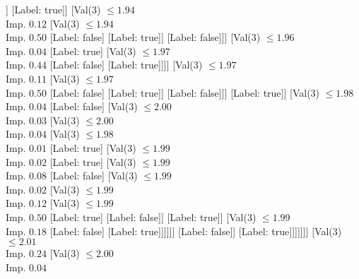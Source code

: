 \documentclass[margin=10pt]{standalone}
\begin{document}
\begin{forest}
													[Val($3$) $ \leq 1.94$ \\ Imp. $0.17$
														[Val($3$) $ \leq 1.93$ \\ Imp. $0.05$
															[Val($3$) $ \leq 1.93$ \\ Imp. $0.44$
																[Label: true]
																[Label: false]]
															[Label: true]]
														[Val($3$) $ \leq 1.94$ \\ Imp. $0.12$
															[Val($3$) $ \leq 1.94$ \\ Imp. $0.50$
																[Label: false]
																[Label: true]]
															[Label: false]]]
													[Val($3$) $ \leq 1.96$ \\ Imp. $0.04$
														[Label: true]
														[Val($3$) $ \leq 1.97$ \\ Imp. $0.44$
															[Label: false]
															[Label: true]]]]
												[Val($3$) $ \leq 1.97$ \\ Imp. $0.11$
													[Val($3$) $ \leq 1.97$ \\ Imp. $0.50$
														[Label: false]
														[Label: true]]
													[Label: false]]]
											[Label: true]]
										[Val($3$) $ \leq 1.98$ \\ Imp. $0.04$
											[Label: false]
											[Val($3$) $ \leq 2.00$ \\ Imp. $0.03$
												[Val($3$) $ \leq 2.00$ \\ Imp. $0.04$
													[Val($3$) $ \leq 1.98$ \\ Imp. $0.01$
														[Label: true]
														[Val($3$) $ \leq 1.99$ \\ Imp. $0.02$
															[Label: true]
															[Val($3$) $ \leq 1.99$ \\ Imp. $0.08$
																[Label: false]
																[Val($3$) $ \leq 1.99$ \\ Imp. $0.02$
																	[Val($3$) $ \leq 1.99$ \\ Imp. $0.12$
																		[Val($3$) $ \leq 1.99$ \\ Imp. $0.50$
																			[Label: true]
																			[Label: false]]
																		[Label: true]]
																	[Val($3$) $ \leq 1.99$ \\ Imp. $0.18$
																		[Label: false]
																		[Label: true]]]]]]
													[Label: false]]
												[Label: true]]]]]]]
						[Val($3$) $ \leq 2.01$ \\ Imp. $0.24$
							[Val($3$) $ \leq 2.00$ \\ Imp. $0.04$

\end{forest}
\end{document}
